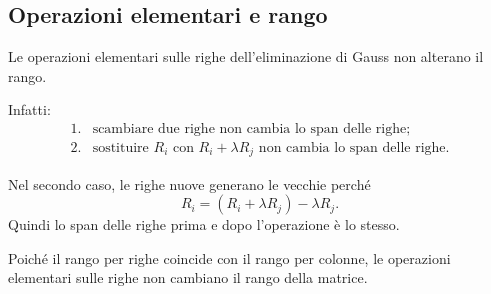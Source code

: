 \documentclass[a4paper]{article}
\begin{document}
\subsection{Operazioni elementari e rango}

Le operazioni elementari sulle righe dell'eliminazione di Gauss non alterano il rango.

Infatti:
\[
    \begin{array}{ll}
        \text{1.} & \text{scambiare due righe non cambia lo span delle righe;}\\[1mm]
        \text{2.} & \text{sostituire } R_i \text{ con } R_i+\lambda R_j \text{ non cambia lo span delle righe.}
    \end{array}
\]

Nel secondo caso, le righe nuove generano le vecchie perché
\[
    R_i=(R_i+\lambda R_j)-\lambda R_j.
\]
Quindi lo span delle righe prima e dopo l'operazione è lo stesso.

Poiché il rango per righe coincide con il rango per colonne, le operazioni elementari sulle righe non cambiano il rango della matrice.
\end{document}
